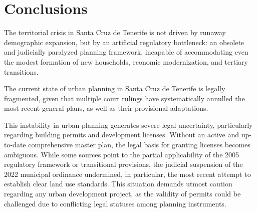 \section{Conclusions}
The territorial crisis in Santa Cruz de Tenerife is not driven by runaway demographic expansion, but by an artificial regulatory bottleneck:
an obsolete and judicially paralyzed planning framework,
incapable of accommodating even the modest formation of new households, economic modernization, and tertiary transitions.

The current state of urban planning in Santa Cruz de Tenerife is legally fragmented,
given that multiple court rulings have systematically annulled the most recent general plans, as well as their provisional adaptations.

This instability in urban planning generates severe legal uncertainty, particularly regarding building permits and development licenses.
Without an active and up-to-date comprehensive master plan, the legal basis for granting licenses becomes ambiguous.
While some sources point to the partial applicability of the 2005 regulatory framework or transitional provisions,
the judicial suspension of the 2022 municipal ordinance undermined, in particular, the most recent attempt to establish clear land use standards. This situation demands utmost caution regarding any urban development project, as the validity of permits could be challenged due to conflicting legal statuses among planning instruments.
